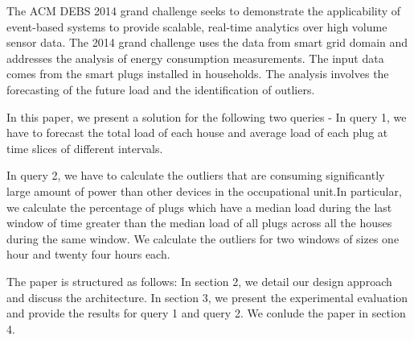 
The ACM DEBS 2014 grand challenge seeks to demonstrate the applicability of event-based systems to provide scalable, real-time analytics over high volume sensor data. The 2014 grand challenge uses the data from smart grid domain and addresses the analysis of energy consumption measurements. The input data comes from the smart plugs installed in households. The analysis involves the forecasting of the future load and the identification of outliers.

In this paper, we present a solution for the following two queries - 
In query 1, we have to forecast the total load of each house and average load of each plug at time slices of different intervals. 

In query 2, we have to calculate the outliers that are consuming significantly large amount of power than other devices in the occupational unit.In particular, we calculate the percentage of plugs which have a median load during the last window of time greater than the median load of all plugs across all the houses during the same window. We calculate the outliers for two windows of sizes one hour and twenty four hours each.

The paper is structured as follows: In section 2, we detail our design approach and discuss the architecture. In section 3, we present the experimental evaluation and provide the results for query 1 and query 2. We conlude the paper in section 4.
